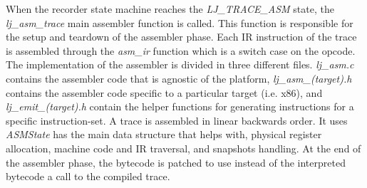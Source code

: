 
When the recorder state machine reaches the \emph{LJ\_TRACE\_ASM} state, the
\emph{lj\_asm\_trace} main assembler function is called. This function is
responsible for the setup and teardown of the assembler phase. Each IR
instruction of the trace is assembled through the \emph{asm\_ir} function which
is a switch case on the opcode. The implementation of the assembler is divided
in three different files. \emph{lj\_asm.c} contains the assembler code that is
agnostic of the platform, \emph{lj\_asm\_(target).h} contains the assembler code
specific to a particular target (i.e. x86), and \emph{lj\_emit\_(target).h}
contain the helper functions for generating instructions for a specific
instruction-set. A trace is assembled in linear backwards order. It uses
\emph{ASMState} has the main data structure that helps with, physical register
allocation, machine code and IR traversal, and snapshots handling. At the end of
the assembler phase, the bytecode is patched to use instead of the interpreted
bytecode a call to the compiled trace.


